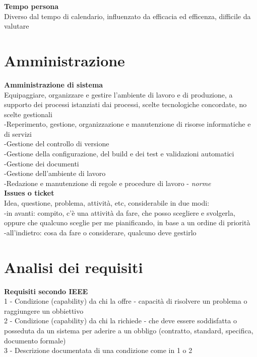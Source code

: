 \documentclass{article}
\begin{document}
			\textbf{Tempo persona}\\
			Diverso dal tempo di calendario, influenzato da efficacia ed efficenza, difficile da valutare\\
		
	\clearpage
	\section{Amministrazione} 
		\textbf{Amministrazione di sistema}\\
		Equipaggiare, organizzare e gestire l'ambiente di lavoro e di produzione, a supporto dei processi istanziati dai processi, scelte tecnologiche concordate, no scelte gestionali\\
		-Reperimento, gestione, organizzazione e manutenzione di risorse informatiche e di servizi\\
		-Gestione del controllo di versione\\
		-Gestione della configurazione, del build e dei test e validazioni automatici\\
		-Gestione dei documenti\\
		-Gestione dell'ambiente di lavoro\\
		-Redazione e manutenzione di regole e procedure di lavoro - \textit{norme}\\
		
		\textbf{Issues o ticket}\\
		Idea, questione, problema, attività, etc, considerabile in due modi:\\
		-in avanti: compito, c'è una attività da fare, che posso scegliere e svolgerla, oppure che qualcuno sceglie per me pianificando, in base a un ordine di priorità\\
		-all'indietro: cosa da fare o considerare, qualcuno deve gestirlo\\
		
	\clearpage
	\section{Analisi dei requisiti}
		\textbf{Requisiti secondo IEEE}\\
		1 - Condizione (capability) da chi la offre - capacità di risolvere un problema o raggiungere un obbiettivo\\
		2 - Condizione (capability) da chi la richiede - che deve essere soddisfatta o posseduta da un sistema per aderire a un obbligo (contratto, standard, specifica, documento formale)\\
		3 - Descrizione documentata di una condizione come in 1 o 2\\
		
\end{document}
